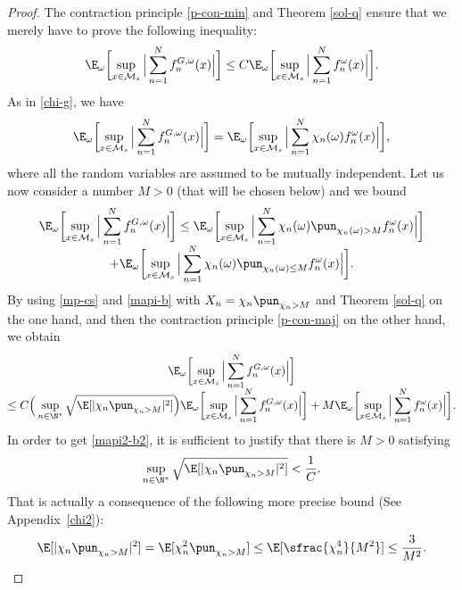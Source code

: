 \begin{proof}
The contraction principle \eqref{p-con-min} and Theorem \ref{sol-q} ensure that we merely have to prove the following inequality:\vspace*{-3pt}
\begin{equation}\label{mapi2-b2}
\E_{\omega}\biggl[\sup_{x\in \mathcal{M}_s} \Big| \sum_{n=1}^N f_n^{G,\omega}(x)\Big| \biggr]\leq C\E_{\omega}\biggl[\sup_{x\in \mathcal{M}_s} \Big| \sum_{n=1}^N f_n^{\omega}(x)\Big| \biggr].
\end{equation}
As in \eqref{chi-g}, we have\vspace*{-3pt}
\begin{equation*}
\E_{\omega}\biggl[\sup_{x\in \mathcal{M}_s} \Big| \sum_{n=1}^N f_n^{G,\omega}(x)\Big| \biggr]=\E_{\omega}\biggl[\sup_{x\in \mathcal{M}_s} \Big| \sum_{n=1}^N \chi_n(\omega)f_n^{\omega}(x)\Big| \biggr],
\end{equation*}
where all the random variables are assumed to be mutually independent.
Let us now consider a number $M>0$ (that will be chosen below) and we bound\vspace*{-.5\baselineskip}
\begin{multline*}
\E_{\omega}\biggl[\sup_{x\in \mathcal{M}_s} \Big| \sum_{n=1}^N f_n^{G,\omega}(x)\Big| \biggr]\leq \E_{\omega}\biggl[\sup_{x\in \mathcal{M}_s} \Big| \sum_{n=1}^N \chi_n(\omega)\pun_{\chi_n(\omega)> M}f_n^{\omega}(x)\Big| \biggr] \\[-5pt]
+ \E_{\omega}\biggl[\sup_{x\in \mathcal{M}_s} \Big| \sum_{n=1}^N \chi_n(\omega)\pun_{\chi_n(\omega)\leq M}f_n^{\omega}(x)\Big| \biggr].
\end{multline*}
By using \eqref{mp-cs} and \eqref{mapi-b} with $X_n=\chi_n \pun_{\chi_n>M}$ and Theorem \ref{sol-q} on the one hand, and then the contraction principle \eqref{p-con-maj} on the other hand, we obtain\vspace*{-3pt}
\begin{multline*}
\E_{\omega}\biggl[\sup_{x\in \mathcal{M}_s} \Big| \sum_{n=1}^N f_n^{G,\omega}(x)\Big| \biggr]\\[-5pt]
\leq C\Big(\sup_{n\in \N^\star} \sqrt{\E[|\chi_n \pun_{\chi_n> M}|^2]} \Big)\E_{\omega}\biggl[\sup_{x\in \mathcal{M}_s} \Big| \sum_{n=1}^N f_n^{G,\omega}(x)\Big| \biggr]
+ M\E_{\omega}\biggl[\sup_{x\in \mathcal{M}_s} \Big| \sum_{n=1}^N f_n^{\omega}(x)\Big| \biggr].
\end{multline*}
In order to get \eqref{mapi2-b2}, it is sufficient to justify that there is
$M>0$ satisfying
\begin{equation*}\sup_{n\in \N^\star} \sqrt{\E[|\chi_n \pun_{\chi_n> M}|^2]} <\frac{1}{C}.
\end{equation*}
That is actually a consequence of the following more precise bound (See Appendix~\ref{chi2}):%
\begin{equation}\label{chi-M}
\E[|\chi_n \pun_{\chi_n> M}|^2]=\E[\chi_n^2 \pun_{\chi_n> M}] \leq \E[\sfrac{\chi_n^4}{M^2}]\leq \frac{3}{M^2}.\qedhere
\end{equation}
\end{proof}

